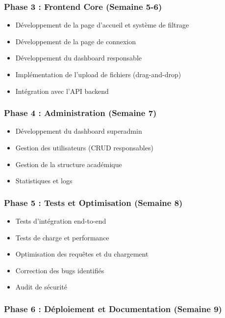 \documentclass[12pt,a4paper]{article}
\begin{document}
\subsubsection{Phase 3 : Frontend Core (Semaine 5-6)}

\begin{itemize}[leftmargin=*]
    \item Développement de la page d'accueil et système de filtrage
    \item Développement de la page de connexion
    \item Développement du dashboard responsable
    \item Implémentation de l'upload de fichiers (drag-and-drop)
    \item Intégration avec l'API backend
\end{itemize}

\subsubsection{Phase 4 : Administration (Semaine 7)}

\begin{itemize}[leftmargin=*]
    \item Développement du dashboard superadmin
    \item Gestion des utilisateurs (CRUD responsables)
    \item Gestion de la structure académique
    \item Statistiques et logs
\end{itemize}

\subsubsection{Phase 5 : Tests et Optimisation (Semaine 8)}

\begin{itemize}[leftmargin=*]
    \item Tests d'intégration end-to-end
    \item Tests de charge et performance
    \item Optimisation des requêtes et du chargement
    \item Correction des bugs identifiés
    \item Audit de sécurité
\end{itemize}

\subsubsection{Phase 6 : Déploiement et Documentation (Semaine 9)}
\end{document}
